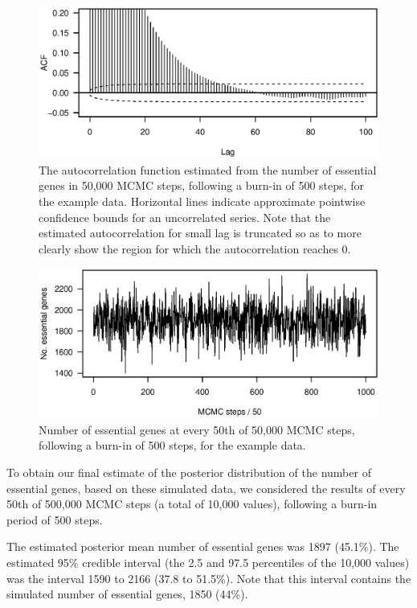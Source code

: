\documentclass[letterpaper]{article}
\begin{document}
\begin{multicols}{2}
\begin{figure}
\begin{center}
\includegraphics{Figs/fig4.ps}
\caption{The autocorrelation function estimated from the number of
essential genes in 50,000 MCMC steps, following a burn-in of 500
steps, for the example data.  Horizontal lines indicate approximate
pointwise confidence bounds for an uncorrelated series.  Note that the
estimated autocorrelation for small lag is truncated so as to more
clearly show the region for which the autocorrelation reaches 0.}
\end{center}
\end{figure}

\begin{figure}
\begin{center}
\includegraphics{Figs/fig5.ps}
\caption{Number of essential genes at every 50th of 50,000 MCMC steps,
following a burn-in of 500 steps, for the example data.}
\end{center}
\end{figure}

To obtain our final estimate of the posterior distribution of the number
of essential genes, based on these simulated data, we considered the
results of every 50th of 500,000 MCMC steps (a total of 10,000
values), following a burn-in period of 500 steps.

The estimated posterior mean number of essential genes was 1897
(45.1\%).  The estimated 95\% credible interval (the 2.5 and
97.5 percentiles of the 10,000 values) was the interval 1590 to 2166
(37.8 to 51.5\%).  Note that this interval contains the simulated
number of essential genes, 1850 (44\%).  


\end{multicols}
\end{document}
